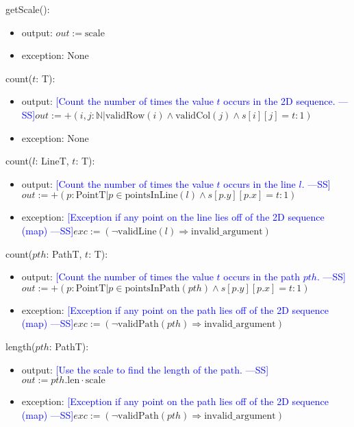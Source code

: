 \documentclass[12pt]{article}
\newcommand{\authornote}[3]{\textcolor{#1}{[#3 ---#2]}}
\newcommand{\authornote}[3]{}
\newcommand{\wss}[1]{\authornote{blue}{SS}{#1}}
\begin{document}
\noindent getScale():
\begin{itemize}
\item output: $out := \mbox{scale}$
\item exception: None
\end{itemize}

\noindent count($t$: T):
\begin{itemize}
\item output: \wss{Count the number of times the value $t$ occurs in the 2D
    sequence.}$out := +(i, j: \mathbb{N}| \mbox{validRow}(i) \land
  \mbox{validCol}(j) \wedge s[i][j] = t : 1)$
\item exception: None
\end{itemize}

\noindent count($l$: LineT, $t$: T):
\begin{itemize}
\item output: \wss{Count the number of times the value $t$ occurs in the line
    $l$.}$out := +(p: \mbox{PointT} | p \in \mbox{pointsInLine}(l) \wedge
  s[p.y][p.x] = t : 1)$
\item exception: \wss{Exception if any point on the line lies off of the 2D
    sequence (map)}$exc := (\neg\mbox{validLine}(l) \Rightarrow \mbox{invalid\_argument})$
\end{itemize}

\noindent count($\mathit{pth}$: PathT, $t$: T):
\begin{itemize}
\item output: \wss{Count the number of times the value $t$ occurs in the path
    $pth$.}$out := +(p: \mbox{PointT} | p \in \mbox{pointsInPath}(\mathit{pth})
  \wedge s[p.y][p.x] = t : 1)$
\item exception: \wss{Exception if any point on the path lies off of the 2D
    sequence (map)}$exc := (\neg\mbox{validPath}(\mathit{pth}) \Rightarrow \mbox{invalid\_argument})$
\end{itemize}

\noindent length($\mathit{pth}$: PathT):
\begin{itemize}
\item output: \wss{Use the scale to find the length of the
    path.}$out := \mathit{pth}.\mbox{len} \cdot \mbox{scale}$
\item exception: \wss{Exception if any point on the path lies off of the 2D
    sequence (map)}$exc := (\neg\mbox{validPath}(\mathit{pth}) \Rightarrow \mbox{invalid\_argument})$
\end{itemize}
\end{document}

